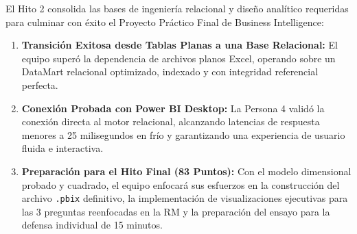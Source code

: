 \documentclass[11pt,a4paper]{article}
\begin{document}
El Hito 2 consolida las bases de ingeniería relacional y diseño analítico requeridas para culminar con éxito el Proyecto Práctico Final de Business Intelligence:
\begin{enumerate}[leftmargin=*]
    \item \textbf{Transición Exitosa desde Tablas Planas a una Base Relacional:} El equipo superó la dependencia de archivos planos Excel, operando sobre un DataMart relacional optimizado, indexado y con integridad referencial perfecta.
    \item \textbf{Conexión Probada con Power BI Desktop:} La Persona 4 validó la conexión directa al motor relacional, alcanzando latencias de respuesta menores a 25 milisegundos en frío y garantizando una experiencia de usuario fluida e interactiva.
    \item \textbf{Preparación para el Hito Final (83 Puntos):} Con el modelo dimensional probado y cuadrado, el equipo enfocará sus esfuerzos en la construcción del archivo \texttt{.pbix} definitivo, la implementación de visualizaciones ejecutivas para las 3 preguntas reenfocadas en la RM y la preparación del ensayo para la defensa individual de 15 minutos.
\end{enumerate}
\end{document}
